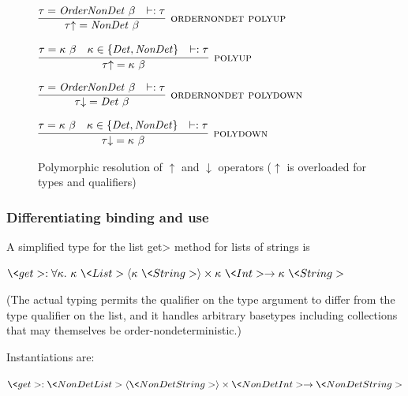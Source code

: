 \begin{figure}
    $\infer[\rulename{ordernondet polyup}]
    {\up{\tau} = \|NonDet \ \beta|}
    {\tau = \|OrderNonDet \ \beta|
        & \wellformed{\tau}
    }$

    \bigskip
    
    $\infer[\rulename{polyup}]
    {\up{\tau} = \kappa \ \beta}
    {\tau =\kappa \ \beta
        & \kappa \in \{\|Det, NonDet|\}
        & \wellformed{\tau}
    }$

    \bigskip

    $\infer[\rulename{ordernondet polydown}]
    {\down{\tau} = \|Det \ \beta|}
    {\tau = \|OrderNonDet \ \beta|
        & \wellformed{\tau}
    }$
    
    \bigskip
    
    $\infer[\rulename{polydown}]
    {\down{\tau} = \kappa \ \beta}
    {\tau =\kappa \ \beta
        & \kappa \in \{\|Det, NonDet|\}
        & \wellformed{\tau}
    }$
\caption{Polymorphic resolution of $\uparrow$ and $\downarrow$ operators ($\uparrow$ is overloaded for types and qualifiers)}
\label{fig:poly-resolutions}
\end{figure}

\subsubsection{Differentiating binding and use}\label{bindings-uses}

A simplified type for the list \<get> method for lists of strings is

$\<get> : \forallt{\kappa} \kappa\ \<List>\angles{\kappa\ \<String>} \times \kappa\ \<Int> \rightarrow \kappa\ \<String>$

(The actual typing permits the qualifier on the type argument to differ
from the type qualifier on the list, and it handles arbitrary basetypes
including collections that may themselves be order-nondeterministic.)

Instantiations are:

$\<get> : \<NonDet List>\angles{\<NonDet String>} \times \<NonDet Int> \rightarrow \<NonDet String>$

